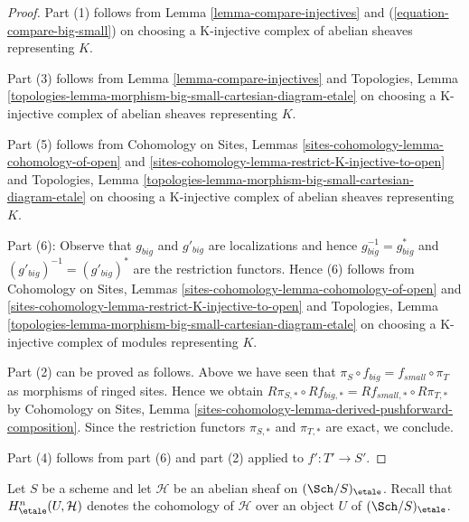 \begin{proof}
Part (1) follows from
Lemma \ref{lemma-compare-injectives}
and (\ref{equation-compare-big-small})
on choosing a K-injective complex of abelian sheaves representing $K$.

\medskip\noindent
Part (3) follows from Lemma \ref{lemma-compare-injectives}
and Topologies, Lemma
\ref{topologies-lemma-morphism-big-small-cartesian-diagram-etale}
on choosing a K-injective complex of abelian sheaves representing $K$.

\medskip\noindent
Part (5) follows from
Cohomology on Sites, Lemmas \ref{sites-cohomology-lemma-cohomology-of-open} and
\ref{sites-cohomology-lemma-restrict-K-injective-to-open}
and Topologies, Lemma
\ref{topologies-lemma-morphism-big-small-cartesian-diagram-etale}
on choosing a K-injective complex of abelian sheaves representing $K$.

\medskip\noindent
Part (6): Observe that $g_{big}$ and $g'_{big}$ are localizations
and hence $g_{big}^{-1} = g_{big}^*$ and $(g'_{big})^{-1} = (g'_{big})^*$
are the restriction functors. Hence (6) follows from
Cohomology on Sites, Lemmas \ref{sites-cohomology-lemma-cohomology-of-open} and
\ref{sites-cohomology-lemma-restrict-K-injective-to-open}
and Topologies, Lemma
\ref{topologies-lemma-morphism-big-small-cartesian-diagram-etale}
on choosing a K-injective complex of modules representing $K$.

\medskip\noindent
Part (2) can be proved as follows. Above we have seen
that $\pi_S \circ f_{big} = f_{small} \circ \pi_T$ as morphisms
of ringed sites. Hence we obtain
$R\pi_{S, *} \circ Rf_{big, *} = Rf_{small, *} \circ R\pi_{T, *}$
by Cohomology on Sites, Lemma
\ref{sites-cohomology-lemma-derived-pushforward-composition}.
Since the restriction functors $\pi_{S, *}$ and $\pi_{T, *}$
are exact, we conclude.

\medskip\noindent
Part (4) follows from part (6) and part (2) applied to $f' : T' \to S'$.
\end{proof}

\noindent
Let $S$ be a scheme and let $\mathcal{H}$ be an abelian sheaf on
$(\Sch/S)_\etale$. Recall that $H^n_\etale(U, \mathcal{H})$ denotes
the cohomology of $\mathcal{H}$ over an object $U$ of $(\Sch/S)_\etale$.

